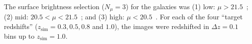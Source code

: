 \documentclass[twocolumn]{aastex6}
\begin{document}
The surface brightness selection ($N_\mu = 3$) for the \ferengi{} galaxies was
(1) low: $\mu > 21.5$~\magarc;  (2) mid: $20.5 < \mu < 21.5$~\magarc; and (3)
high: $\mu < 20.5$~\magarc. For each of the four ``target redshifts''
($z_\mathrm{sim} = 0.3, 0.5, 0.8$ and $1.0$), the images were redshifted in
$\Delta z = 0.1$ bins up to $z_\mathrm{sim}=1.0$. 
 
\end{document}
